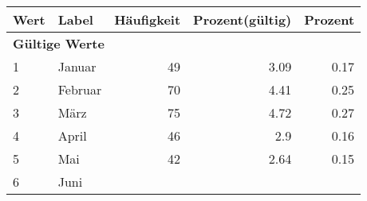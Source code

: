      \begin{longtable}{lXrrr}
     \toprule
     \textbf{Wert} & \textbf{Label} & \textbf{Häufigkeit} & \textbf{Prozent(gültig)} & \textbf{Prozent} \\
     \endhead
     \midrule
     \multicolumn{5}{l}{\textbf{Gültige Werte}}\\

     1 &
     \multicolumn{1}{X}{ Januar   } &


       \num{49} &
       \num[round-mode=places,round-precision=2]{3.09} &
         \num[round-mode=places,round-precision=2]{0.17} \\

     2 &
     \multicolumn{1}{X}{ Februar   } &


       \num{70} &
       \num[round-mode=places,round-precision=2]{4.41} &
         \num[round-mode=places,round-precision=2]{0.25} \\

     3 &
     \multicolumn{1}{X}{ März   } &


       \num{75} &
       \num[round-mode=places,round-precision=2]{4.72} &
         \num[round-mode=places,round-precision=2]{0.27} \\

     4 &
     \multicolumn{1}{X}{ April   } &


       \num{46} &
       \num[round-mode=places,round-precision=2]{2.9} &
         \num[round-mode=places,round-precision=2]{0.16} \\

     5 &
     \multicolumn{1}{X}{ Mai   } &


       \num{42} &
       \num[round-mode=places,round-precision=2]{2.64} &
         \num[round-mode=places,round-precision=2]{0.15} \\

     6 &
     \multicolumn{1}{X}{ Juni   } &



\end{longtable}
